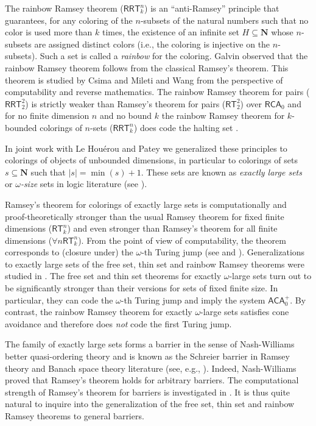 \documentclass{amsart}
\theoremstyle{plain}
\theoremstyle{plain}
\newcommand{\om}{\omega}
\newcommand\Nat{\mathbf{N}}
\newcommand\RCA{\mathsf{RCA}}
\newcommand\ACA{\mathsf{ACA}}
\newcommand\RT{\mathsf{RT}}
\newcommand\RRT{\mathsf{RRT}}
\begin{document}
The rainbow Ramsey theorem ($\RRT^n_k$) is an “anti-Ramsey” principle that guarantees, for any coloring of the $n$-subsets of the natural numbers such that no color is used more than $k$ times, the existence of an infinite set $H\subseteq\Nat$ whose $n$-subsets are assigned distinct colors (i.e., the coloring is injective on the $n$-subsets). Such a set is called a {\em rainbow} for the coloring. Galvin \cite{galvinBorelSetsRamsey1973} observed that the rainbow Ramsey theorem follows from the classical Ramsey's theorem. This theorem is studied by Csima and Mileti \cite{CsimaMileti_2009} and Wang \cite{wang2014some} from the perspective of computability and reverse mathematics. The rainbow Ramsey theorem for pairs ($\RRT^2_2$) is strictly weaker than Ramsey's theorem for pairs ($\RT^2_2$) over $\RCA_0$ and for no finite dimension $n$ and no bound $k$ the rainbow Ramsey theorem for $k$-bounded colorings of $n$-sets ($\RRT^n_k$) does code the halting set \cite{wang2014some}.


In joint work with Le Hou\'erou and Patey \cite{carlucci2024ramseyliketheoremsschreierbarrier} we generalized these principles to colorings of objects of unbounded dimensions, in particular to colorings of sets $s\subseteq \Nat$ such that $|s|=\min(s)+1$. These sets are known as {\em exactly large sets} or {\em $\om$-size} sets in logic literature (see \cite{carlucci2014strength,carlucci_volpi_zdanowski_25,marcone_montalban_volpi_25}). 

Ramsey's theorem for colorings of exactly large sets is computationally and proof-theoretically stronger than the usual Ramsey theorem for fixed finite dimensions ($\RT^n_k$) and even stronger than Ramsey's theorem for all finite dimensions ($\forall n \RT^n_k$). From the point of view of computability, the theorem corresponds to (closure under) the $\om$-th Turing jump (see \cite{Clote1984} and \cite{carlucci2014strength}). 
Generalizations to exactly large sets of the free set, thin set and rainbow Ramsey theorems were studied in \cite{carlucci2024ramseyliketheoremsschreierbarrier}. The free set and thin set theorems for exactly $\om$-large sets turn out to be significantly stronger than their versions for sets of fixed finite size. In particular, they can code the $\om$-th Turing jump and imply the system $\ACA_0^{+}$. By contrast, the rainbow Ramsey theorem for exactly $\om$-large sets satisfies cone avoidance and therefore does {\em not} code the first Turing jump. 

The family of exactly large sets forms a barrier in the sense of Nash-Williams better quasi-ordering theory and is known as the Schreier barrier in Ramsey theory and Banach space theory literature (see, e.g., \cite{Todorcevic+2010}). Indeed, Nash-Williams proved that Ramsey's theorem holds for arbitrary barriers. The computational strength of Ramsey's theorem for barriers is investigated in \cite{Clote1984}. It is thus quite natural to inquire into the generalization of the free set, thin set and rainbow Ramsey theorems to general barriers. 
\end{document}
